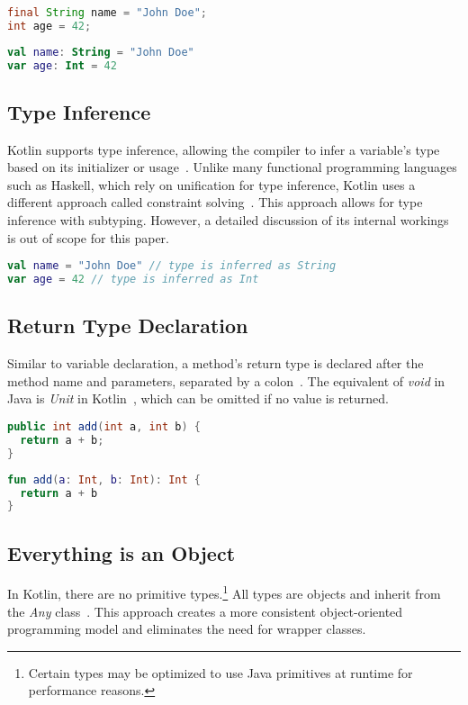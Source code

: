 \documentclass[a4paper,11pt]{article}
\begin{document}
\begin{lstlisting}[language=Java, title={Java data types}]
final String name = "John Doe";
int age = 42;
\end{lstlisting}

\begin{lstlisting}[language=Kotlin, title={Kotlin data types}]
val name: String = "John Doe"
var age: Int = 42
\end{lstlisting}

\subsection{Type Inference}
Kotlin supports type inference, allowing the compiler to infer a variable's type based on its initializer or usage~\cite{type-inference}.
Unlike many functional programming languages such as Haskell, which rely on unification for type inference, Kotlin uses a different approach called constraint solving~\cite{type-constraints}.
This approach allows for type inference with subtyping.
However, a detailed discussion of its internal workings is out of scope for this paper.

\begin{lstlisting}[language=Kotlin]
val name = "John Doe" // type is inferred as String
var age = 42 // type is inferred as Int
\end{lstlisting}

\subsection{Return Type Declaration}
Similar to variable declaration, a method's return type is declared after the method name and parameters, separated by a colon~\cite{functions}. The equivalent of \textit{void} in Java is \textit{Unit} in Kotlin~\cite{builtin-types-unit,kotlin-stdlib-unit}, which can be omitted if no value is returned.

\begin{lstlisting}[language=Java, title={Java method declaration}]
public int add(int a, int b) {
  return a + b;
}
\end{lstlisting}

\begin{lstlisting}[language=Kotlin, title={Kotlin method declaration}]
fun add(a: Int, b: Int): Int {
  return a + b
}
\end{lstlisting}

\subsection{Everything is an Object}
In Kotlin, there are no primitive types.\footnote{Certain types may be optimized to use Java primitives at runtime for performance reasons.} All types are objects and inherit from the \textit{Any} class~\cite{basic-types}. This approach creates a more consistent object-oriented programming model and eliminates the need for wrapper classes.
\end{document}
